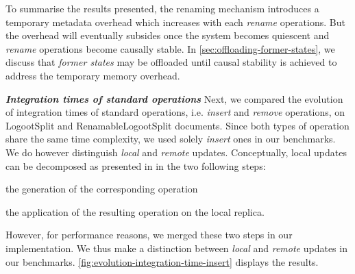 \documentclass[10pt,journal,compsoc]{IEEEtran}
\newcommand{\ie}{i.e. }
\newcommand{\headerparagraph}[1]{\textbf{\emph{#1}}\quad}
\begin{document}
To summarise the results presented, the renaming mechanism introduces a temporary metadata overhead which increases with each \emph{rename} operations.
But the overhead will eventually subsides once the system becomes quiescent and \emph{rename} operations become causally stable.
In \autoref{sec:offloading-former-states}, we discuss that \emph{former states} may be offloaded until causal stability is achieved to address the temporary memory overhead.

\headerparagraph{Integration times of standard operations}
%
Next, we compared the evolution of integration times of standard operations, \ie \emph{insert} and \emph{remove} operations, on LogootSplit and RenamableLogootSplit documents.
Since both types of operation share the same time complexity, we used solely \emph{insert} ones in our benchmarks.
We do however distinguish \emph{local} and \emph{remote} updates.
Conceptually, local updates can be decomposed as presented in \cite{baquero2017pure} in the two following steps:
\begin{enumerate*}[label=(\roman*)]
    \item the generation of the corresponding operation
    \item the application of the resulting operation on the local replica.
\end{enumerate*}
However, for performance reasons, we merged these two steps in our implementation.
We thus make a distinction between \emph{local} and \emph{remote} updates in our benchmarks.
\autoref{fig:evolution-integration-time-insert} displays the results.
\end{document}
